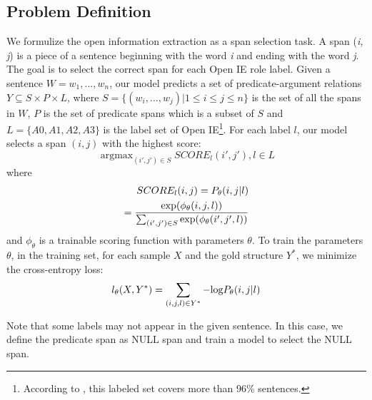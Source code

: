 \documentclass[letterpaper]{article} %
\begin{document}
\subsection{Problem Definition}
We formulize the open information extraction as a span selection task. A span (\textit{i, j}) is a piece of a sentence beginning with the word \textit{i} and ending with the word \textit{j}. The goal is to select the correct span for each Open IE role label. Given a sentence $W=w_1,...,w_n$, our model predicts a set of predicate-argument relations $Y \subseteq  S \times P \times L$, where $S=\{(w_i,...,w_j)|1\leq i \leq j \leq n\}$ is the set of all the spans in $W$, $P$ is the set of predicate spans which is a subset of $S$ and $L=\{A0, A1, A2, A3\}$ is the label set of Open IE\footnote{According to \cite{Stanovsky2018SupervisedOI}, this labeled set covers more than 96\% sentences.}. For each label $l$, our model selects a span $(i,j)$ with the highest score:
\begin{equation}
    \mathop{\arg\max}_{(i',j')\in S} SCORE_l (i',j'), l \in L
\end{equation}
where
\begin{equation}
    \begin{split}
      SCORE_l (i,j)= P_{\theta}(i,j|l) \\ = \frac{{\rm exp}(\phi_\theta (i,j,l))}{\sum_{(i',j') \in S} {\rm exp}(\phi_\theta (i',j',l))}
    \end{split}
\end{equation}
and $\phi_\theta$ is a trainable scoring function with parameters $\theta$. To train the parameters $\theta$, in the training set, for each sample $X$ and the gold structure $Y^*$, we minimize the cross-entropy loss:
\begin{equation}\label{loss}
    l_\theta(X,Y^*)=\sum_{(i,j,l)\in Y^*} -{\rm log} P_{\theta}(i,j|l)
\end{equation}

Note that some labels may not appear in the given sentence. In this case, we define the predicate span as NULL span and train a model to select the NULL span.
\end{document}
